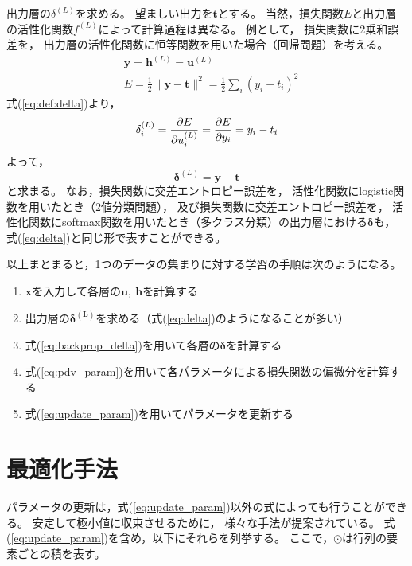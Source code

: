 \documentclass[class=jsarticle, crop=false, dvipdfmx, fleqn]{standalone}
\begin{document}
出力層の$\delta^{(L)}$を求める。
望ましい出力を$\bm{t}$とする。
当然，損失関数$E$と出力層の活性化関数$f^{(L)}$によって計算過程は異なる。
例として，
損失関数に2乗和誤差を，
出力層の活性化関数に恒等関数を用いた場合（回帰問題）を考える。
\begin{align}
& \bm{y} = \bm{h}^{(L)} = \bm{u}^{(L)} \\
& E = \frac{1}{2} \| \bm{y} - \bm{t} \|^2 = \frac{1}{2} \sum_i (y_i - t_i)^2
\end{align}
式(\ref{eq:def:delta})より，
\begin{equation}
\delta_i^{(L)} = \pdv{E}{u_i^{(L)}} = \pdv{E}{y_i} = y_i - t_i
\end{equation}
よって，
\begin{equation}
\bm{\delta}^{(L)} = \bm{y - t}
\label{eq:delta}
\end{equation}
と求まる。
なお，損失関数に交差エントロピー誤差を，
活性化関数にlogistic関数を用いたとき（2値分類問題），
及び損失関数に交差エントロピー誤差を，
活性化関数にsoftmax関数を用いたとき（多クラス分類）の出力層における$\bm{\delta}$も，
式(\ref{eq:delta})と同じ形で表すことができる。

以上まとまると，1つのデータの集まりに対する学習の手順は次のようになる。

\begin{enumerate}
\item $\bm{x}$を入力して各層の$\bm{u},\ \bm{h}$を計算する
\item 出力層の$\bm{\delta^{(L)}}$を求める（式(\ref{eq:delta})のようになることが多い）
\item 式(\ref{eq:backprop_delta})を用いて各層の$\bm{\delta}$を計算する
\item 式(\ref{eq:pdv_param})を用いて各パラメータによる損失関数の偏微分を計算する
\item 式(\ref{eq:update_param})を用いてパラメータを更新する
\end{enumerate}



\section{最適化手法}

パラメータの更新は，式(\ref{eq:update_param})以外の式によっても行うことができる。
安定して極小値に収束させるために，
様々な手法が提案されている。
式(\ref{eq:update_param})を含め，以下にそれらを列挙する。
ここで，$\odot$は行列の要素ごとの積を表す。
\end{document}
